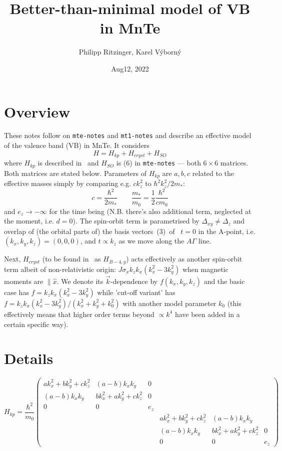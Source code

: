 \documentclass{article}
\title{Better-than-minimal model of VB in MnTe}
\author{Philipp Ritzinger, Karel V\'yborn\'y}
\date{Aug12, 2022}
\begin{document}
\maketitle

\section*{Overview}

These notes follow on {\tt mte-notes} and {\tt mt1-notes} and describe
an effective model of the valence band (VB) in MnTe. It considers
%
\begin{equation}
  H=H_{kp}+H_{cryst}+H_{SO}
\label{eq-01}
\end{equation}
%
where $H_{kp}$ is described in~\cite{PFjr} and $H_{SO}$ is (6) in
{\tt mte-notes} --- both $6\times 6$ matrices. Both matrices are
stated below. Parameters of $H_{kp}$ are $a,b,c$ related to the
effective masses simply by comparing e.g. $ck_z^2$ to $\hbar^2 k_z^2/2m_*$:
%
\begin{equation}
  c=\frac{\hbar^2}{2m_*}\qquad \frac{m_*}{m_0}={\textstyle{\frac12}} \frac{\hbar^2}{cm_0}
  \label{eq-02}
\end{equation}  
%
and $e_z\to-\infty$ for the time being (N.B. there's also additional
term, neglected at the moment, i.e. $d=0$). The spin-orbit term is
parametrised by $\Delta_{xy}\not=\Delta_z$ and overlap of (the orbital
parts of) the basis vectors~(3)~of~\cite{PFjr} $t=0$ in the A-point,
i.e. $(k_x,k_y,k_z)=(0,0,0)$, and $t\propto k_z$ as we move along the $A\Gamma$
line.

Next, $H_{cryst}$ (to be found in~\cite{LandT}
as $H_{B-4,g}$) acts effectively as another spin-orbit term albeit of
non-relativistic origin: $J\sigma_x k_zk_x(k_x^2-3k_y^2)$ when magnetic
moments are $\parallel \hat{x}$. We denote its $\vec{k}$-dependence by
$f(k_x,k_y,k_z)$ and the basic case has $f=k_zk_x(k_x^2-3k_y^2)$ while
'cut-off variant' has $f=k_zk_x(k_x^2-3k_y^2)/(k_x^2+k_y^2+k_0^2)$ with
another model parameter $k_0$ (this effectively means that higher order
terms beyond $\propto k^4$ have been added in a certain specific way).

\section*{Details}

$$ H_{kp} = \frac{\hbar^2}{m_0} \begin{pmatrix}
	a k_x^2 + b k_y^2 + c k_z^2 & (a-b) k_x k_y & 0 & & &\\
	(a-b) k_x k_y & b k_x^2 + a k_y^2 + c k_z^2 & 0 & & & \\
	0 & 0 & e_z & & & \\
	& & & a k_x^2 + b k_y^2 + c k_z^2 & (a-b) k_x k_y \\
	& & & (a-b) k_x k_y & b k_x^2 + a k_y^2 + c k_z^2 & 0 \\
	& & & 0 & 0 & e_z
\end{pmatrix}$$
\end{document}
